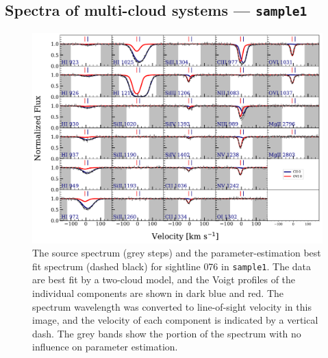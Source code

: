 \documentclass[fleqn,usenatbib]{mnras}
\begin{document}
\subsection{Spectra of multi-cloud systems --- \texttt{sample1}}
\label{s: results -- sample1}

\begin{figure}
    \centering
    \includegraphics[width=\textwidth]{figures/sample1/Models_076.pdf}
    \caption{
    The source spectrum (grey steps) and the parameter-estimation best fit spectrum (dashed black) for sightline 076 in \texttt{sample1}.
    The data are best fit by a two-cloud model, and the Voigt profiles of the individual components are shown in dark blue and red.
    The spectrum wavelength was converted to line-of-sight velocity in this image,
    and the velocity of each component is indicated by a vertical dash.
    The grey bands show the portion of the spectrum with no influence on parameter estimation.
    }
    \label{f: sample1 spectrum}
\end{figure}
\end{document}
